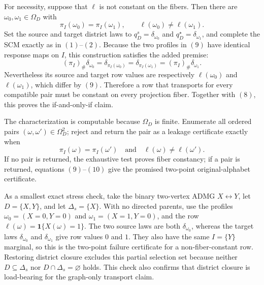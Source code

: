 For necessity, suppose that \(\ell\) is not constant on the fibers.  Then
there are \(\omega_0,\omega_1\in\Omega_D\) with
\[
\pi_I(\omega_0)=\pi_I(\omega_1),
\qquad
\ell(\omega_0)\ne\ell(\omega_1).
\tag{9}
\]
Set the source and target district laws to
\(q_D^s=\delta_{\omega_0}\) and
\(q_D^\star=\delta_{\omega_1}\), and complete the SCM exactly as in
\((1)\)--\((2)\).  Because the two profiles in \((9)\) have identical
response maps on \(I\), this construction satisfies the added premise:
\[
(\pi_I)_\#\delta_{\omega_0}
=\delta_{\pi_I(\omega_0)}
=\delta_{\pi_I(\omega_1)}
=(\pi_I)_\#\delta_{\omega_1}.
\tag{10}
\]
Nevertheless its source and target row values are respectively
\(\ell(\omega_0)\) and \(\ell(\omega_1)\), which differ by \((9)\).
Therefore a row that transports for every compatible pair must be constant
on every projection fiber.  Together with \((8)\), this proves the
if-and-only-if claim.

The characterization is computable because \(\Omega_D\) is finite.  Enumerate
all ordered pairs \((\omega,\omega')\in\Omega_D^2\); reject and return the
pair as a leakage certificate exactly when
\[
\pi_I(\omega)=\pi_I(\omega')
\quad\text{and}\quad
\ell(\omega)\ne\ell(\omega').
\tag{11}
\]
If no pair is returned, the exhaustive test proves fiber constancy; if a
pair is returned, equations \((9)\)--\((10)\) give the promised two-point
original-alphabet certificate.

As a smallest exact stress check, take the binary two-vertex ADMG
\(X\leftrightarrow Y\), let \(D=\{X,Y\}\), and let
\(\Delta_s=\{X\}\).  With no directed parents, use the profiles
\(\omega_0=(X=0,Y=0)\) and \(\omega_1=(X=1,Y=0)\), and the row
\(\ell(\omega)=\mathbf 1\{X(\omega)=1\}\).  The two source laws are both
\(\delta_{\omega_0}\), whereas the target laws
\(\delta_{\omega_0}\) and \(\delta_{\omega_1}\) give row values \(0\) and
\(1\).  They also have the same \(I=\{Y\}\) marginal, so this is the
two-point failure certificate for a non-fiber-constant row.  Restoring
district closure excludes this partial selection set because neither
\(D\subseteq\Delta_s\) nor \(D\cap\Delta_s=\varnothing\) holds.  This check
also confirms that district closure is load-bearing for the graph-only
transport claim.